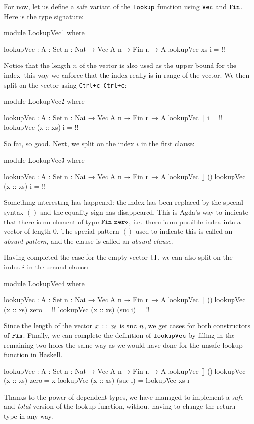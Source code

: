 \documentclass[a4paper,UKenglish]{tufte-handout}
\theoremstyle{definition}
\newcommand\var[1]{\mathit{#1}}
\newcommand\fun[1]{{\AgdaFunction{#1}}}
\newcommand\data[1]{{\AgdaFunction{#1}}}
\newcommand\con[1]{{\AgdaInductiveConstructor{#1}}}
\newcommand\zero{\con{zero}}
\newcommand\suc{\con{suc}}
\renewcommand\Vec{\data{Vec}}
\newcommand\nil{\con{[]}}
\newcommand\cons{\con{::}}
\newcommand\Fin{\data{Fin}}
\begin{document}
For now, let us define a safe variant of the $\fun{lookup}$ function
using $\Vec$ and $\Fin$. Here is the type signature:
\begin{code}[hide]
module LookupVec1 where
\end{code}
\begin{code}[number]
  lookupVec : {A : Set} {n : Nat} → Vec A n → Fin n → A
  lookupVec xs i = {!!}
\end{code}
Notice that the length $n$ of the vector is also used as the upper
bound for the index: this way we enforce that the index really is in
range of the vector. We then split on the vector \var{xs} using \texttt{Ctrl+c Ctrl+c}:
\begin{code}[hide]
module LookupVec2 where
\end{code}
\begin{code}[number]
  lookupVec : {A : Set} {n : Nat} → Vec A n → Fin n → A
  lookupVec []         i = {!!}
  lookupVec (x :: xs)  i = {!!}
\end{code}
So far, so good. Next, we split on the index $i$ in the
first clause:
\begin{code}[hide]
module LookupVec3 where
\end{code}
\begin{code}[number]
  lookupVec : {A : Set} {n : Nat} → Vec A n → Fin n → A
  lookupVec []         ()
  lookupVec (x :: xs)  i   = {!!}
\end{code}
Something interesting has happened: the index has been replaced by 
the special syntax $()$ and the equality sign
has disappeared. This is Agda's way to indicate that there is no
element of type $\Fin\ \zero$, i.e.~there is no possible index into a
vector of length $0$. The special pattern $()$ used to indicate this
is called an \emph{absurd pattern}, and the clause is called an
\emph{absurd clause}.


Having completed the case for the empty vector $\nil$, we can
also split on the index $i$ in the second clause:
\begin{code}[hide]
module LookupVec4 where
\end{code}
\begin{code}[number]
  lookupVec : {A : Set} {n : Nat} → Vec A n → Fin n → A
  lookupVec []         ()
  lookupVec (x :: xs)  zero     = {!!}
  lookupVec (x :: xs)  (suc i)  = {!!}
\end{code}
Since the length of the vector $x\ \cons\ \var{xs}$ is $\suc\ n$,
we get cases for both constructors of $\Fin$.
Finally, we can complete the definition of $\fun{lookupVec}$ by
filling in the remaining two holes the same way as we would have done
for the unsafe lookup function in Haskell.
\begin{code}[number]
lookupVec : {A : Set} {n : Nat} → Vec A n → Fin n → A
lookupVec []         ()
lookupVec (x :: xs)  zero     = x
lookupVec (x :: xs)  (suc i)  = lookupVec xs i
\end{code}
Thanks to the power of dependent types, we have managed to implement a
\emph{safe} and \emph{total} version of the lookup function, without
having to change the return type in any way.
\end{document}
